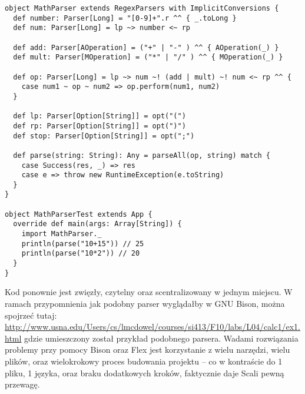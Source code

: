 \newpage
\begin{lstlisting}[caption={Przykładowy parser obliczający podczas parsowania proste zadania arytmetyczne}, label={mathsimple}]
object MathParser extends RegexParsers with ImplicitConversions {
  def number: Parser[Long] = "[0-9]+".r ^^ { _.toLong }
  def num: Parser[Long] = lp ~> number <~ rp
  
  def add: Parser[AOperation] = ("+" | "-" ) ^^ { AOperation(_) }
  def mult: Parser[MOperation] = ("*" | "/" ) ^^ { MOperation(_) }

  def op: Parser[Long] = lp ~> num ~! (add | mult) ~! num <~ rp ^^ {
    case num1 ~ op ~ num2 => op.perform(num1, num2)
  }

  def lp: Parser[Option[String]] = opt("(")
  def rp: Parser[Option[String]] = opt(")")
  def stop: Parser[Option[String]] = opt(";")
  
  def parse(string: String): Any = parseAll(op, string) match {
    case Success(res, _) => res
    case e => throw new RuntimeException(e.toString)
  }
}

object MathParserTest extends App {
  override def main(args: Array[String]) {
    import MathParser._
    println(parse("10+15")) // 25
    println(parse("10*2")) // 20
  }
}
\end{lstlisting}


Kod ponownie jest zwięzły, czytelny oraz scentralizowany w jednym miejscu. W ramach przypomnienia jak podobny parser wyglądałby w GNU Bison, 
można spojrzeć tutaj: \href{http://www.usna.edu/Users/cs/lmcdowel/courses/si413/F10/labs/L04/calc1/ex1.html}{http://www.usna.edu/Users/cs/lmcdowel/courses/si413/F10/labs/L04/calc1/ex1.html}
gdzie umieszczony został przykład podobnego parsera. Wadami rozwiązania problemy przy pomocy Bison oraz Flex jest korzystanie z wielu narzędzi,
wielu plików, oraz wielokrokowy proces budowania projektu -- co w kontraście do 1 pliku, 1 języka, oraz braku dodatkowych kroków, faktycznie daje Scali pewną przewagę.